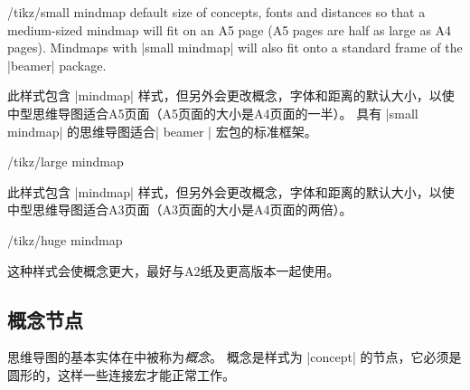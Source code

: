 \begin{stylekey}{/tikz/small mindmap}
    default size of concepts, fonts and distances so that a medium-sized
    mindmap will fit on an A5 page (A5 pages are half as large as A4 pages). Mindmaps with |small mindmap| will also fit onto a standard frame of the |beamer| package.

    此样式包含 |mindmap| 样式，但另外会更改概念，字体和距离的默认大小，以使中型思维导图适合A5页面（A5页面的大小是A4页面的一半）。 具有 |small mindmap| 的思维导图适合| beamer | 宏包的标准框架。
\end{stylekey}

\begin{stylekey}{/tikz/large mindmap}

    此样式包含 |mindmap| 样式，但另外会更改概念，字体和距离的默认大小，以使中型思维导图适合A3页面（A3页面的大小是A4页面的两倍）。
\end{stylekey}

\begin{stylekey}{/tikz/huge mindmap}

    这种样式会使概念更大，最好与A2纸及更高版本一起使用。
\end{stylekey}


\subsection{概念节点}


思维导图的基本实体在\tikzname 中被称为\emph{概念}。 概念是样式为 |concept| 的节点，它必须是圆形的，这样一些连接宏才能正常工作。

